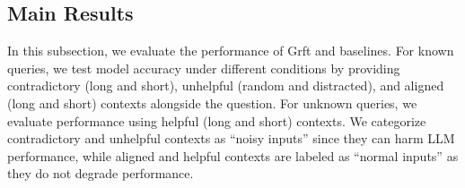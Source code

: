 






\subsection{Main Results}
In this subsection, we evaluate the performance of Grft and baselines. For known queries, we test model accuracy under different conditions by providing contradictory (long and short), unhelpful (random and distracted), and aligned (long and short) contexts alongside the question. For unknown queries, we evaluate performance using helpful (long and short) contexts. We categorize contradictory and unhelpful contexts as ``noisy inputs'' since they can harm LLM performance, while aligned and helpful contexts are labeled as ``normal inputs'' as they do not degrade performance. 



